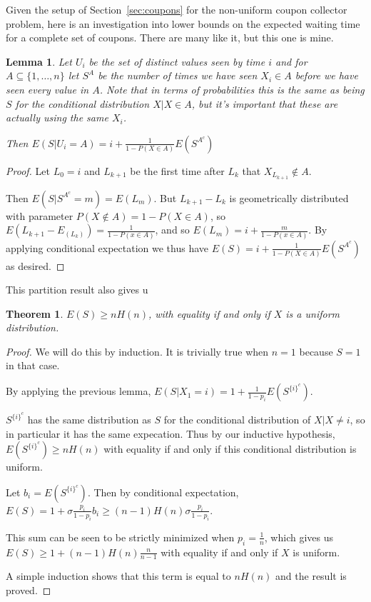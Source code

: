 \documentclass[a4paper]{book}
\newtheorem{lemma}{Lemma}
\newtheorem{theorem}{Theorem}
\begin{document}
Given the setup of Section~\ref{sec:coupons} for the non-uniform coupon collector problem,
here is an investigation into lower bounds on the expected waiting time for a complete set of coupons.
There are many like it, but this one is mine.

\begin{lemma}\label{lemma:couponpartition}
Let \(U_i\) be the set of distinct values seen by time \(i\) and for \(A \subseteq \{1, \ldots, n\}\) let \(S^A\) be the number of times we have seen \(X_i \in A\) before we have seen every value in \(A\).
Note that in terms of probabilities this is the same as being \(S\) for the conditional distribution \(X | X \in A\),
but it's important that these are actually using the same \(X_i\).

Then \(E(S|U_i = A) = i + \frac{1}{1 - P(X \in A)} E(S^{A^c})\)
\end{lemma}

\begin{proof}
Let \(L_0 = i\) and \(L_{k + 1}\) be the first time after \(L_k\) that \(X_{L_{k + 1}} \not\in A\).

Then \(E(S | S^{A^c} = m) = E(L_m)\).
But \(L_{k + 1} - L_{k}\) is geometrically distributed with parameter \(P(X \not\in A) = 1 - P(X \in A)\),
so \(E(L_{k + 1} - E_(L_k)) = \frac{1}{1 - P(x \in A)}\),
and so \(E(L_m) = i + \frac{m}{1 - P(x \in A)}\).
By applying conditional expectation we thus have \(E(S) = i + \frac{1}{1 - P(X \in A)} E(S^{A^c})\) as desired.
\end{proof}

This partition result also gives u

\begin{theorem}
\(E(S) \geq n H(n)\), with equality if and only if \(X\) is a uniform distribution.
\end{theorem}

\begin{proof}
We will do this by induction.
It is trivially true when \(n = 1\) because \(S = 1\) in that case.

By applying the previous lemma,
\(E(S | X_1 = i) = 1 + \frac{1}{1 - p_i} E(S^{{\{i\}}^c})\).

\(S^{{\{i\}}^c}\) has the same distribution as \(S\) for the conditional distribution of \(X | X \neq i\),
so in particular it has the same expecation.
Thus by our inductive hypothesis,
\(E(S^{{\{i\}}^c}) \geq n H(n)\) with equality if and only if this conditional distribution is uniform.

Let \(b_i = E(S^{{\{i\}}^c})\).
Then by conditional expectation,
\(E(S) = 1 + \sigma \frac{p_i}{1 - p_i} b_i \geq (n - 1) H(n) \sigma \frac{p_i}{1 - p_i} \).

This sum can be seen to be strictly minimized when \(p_i = \frac{1}{n}\),
which gives us \(E(S) \geq 1 + (n - 1) H(n) \frac{n}{n - 1}\) with equality if and only if \(X\) is uniform.

A simple induction shows that this term is equal to \(n H(n)\) and the result is proved.
\end{proof}
\end{document}

